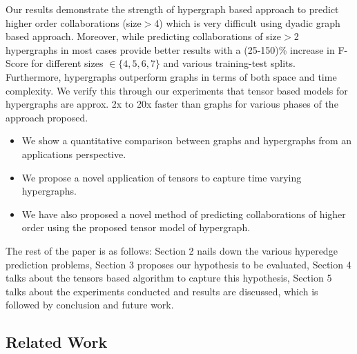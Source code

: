 \documentclass{sig-alternate}
\begin{document}
Our results demonstrate the strength of hypergraph based approach to predict higher order collaborations (size$>$4) which is very difficult using dyadic graph based approach. Moreover, while predicting collaborations of size$>$2 hypergraphs in most cases provide better results with a (25-150)\% increase in F-Score for different sizes $\in \{4,5,6,7\}$ and various training-test splits. Furthermore, hypergraphs outperform graphs in terms of both space and time complexity. We verify this through our experiments that tensor based models for hypergraphs are approx. 2x to 20x faster than graphs for various phases of the approach proposed. 

\begin{itemize}

\item We show a quantitative comparison between graphs and hypergraphs from an applications perspective. 

\item We propose a novel application of tensors to capture time varying hypergraphs. 

\item We have also proposed a novel method of predicting collaborations of higher order using the proposed tensor model of hypergraph. 

\end{itemize} 

The rest of the paper is as follows: Section 2 nails down the various hyperedge prediction problems, Section 3 proposes our hypothesis to be evaluated, Section 4 talks about the tensors based algorithm to capture this hypothesis, Section 5 talks about the experiments conducted and results are discussed, which is followed by conclusion and future work.

\subsection{Related Work}
\end{document}
